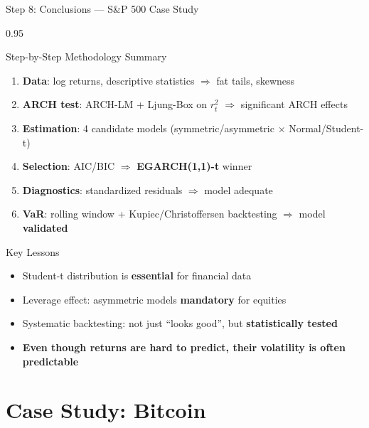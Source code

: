 \documentclass[9pt, aspectratio=169, t]{beamer}
\begin{document}
\begin{frame}{Step 8: Conclusions --- S\&P 500 Case Study}
    \begin{cminipage}{0.95\textwidth}
    \begin{block}{Step-by-Step Methodology Summary}
        \begin{enumerate}\setlength{\itemsep}{2pt}
            \item \textbf{Data}: log returns, descriptive statistics $\Rightarrow$ fat tails, skewness
            \item \textbf{ARCH test}: ARCH-LM + Ljung-Box on $r_t^2$ $\Rightarrow$ significant ARCH effects
            \item \textbf{Estimation}: 4 candidate models (symmetric/asymmetric $\times$ Normal/Student-t)
            \item \textbf{Selection}: AIC/BIC $\Rightarrow$ \textbf{EGARCH(1,1)-t} winner
            \item \textbf{Diagnostics}: standardized residuals $\Rightarrow$ model adequate
            \item \textbf{VaR}: rolling window + Kupiec/Christoffersen backtesting $\Rightarrow$ model \textbf{validated}
        \end{enumerate}
    \end{block}
    \vspace{0.1cm}
    \begin{alertblock}{Key Lessons}
        \begin{itemize}\setlength{\itemsep}{0pt}
            \item Student-t distribution is \textbf{essential} for financial data
            \item Leverage effect: asymmetric models \textbf{mandatory} for equities
            \item Systematic backtesting: not just ``looks good'', but \textbf{statistically tested}
            \item \textbf{Even though returns are hard to predict, their volatility is often predictable}
        \end{itemize}
    \end{alertblock}
    \end{cminipage}
\end{frame}

\section{Case Study: Bitcoin}
\end{document}
